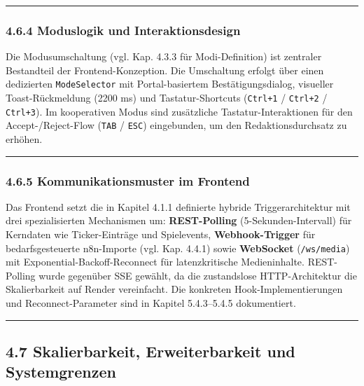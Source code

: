 \begin{center}\rule{0.5\linewidth}{0.5pt}\end{center}

\subsubsection{4.6.4 Moduslogik und
Interaktionsdesign}\label{moduslogik-und-interaktionsdesign}

Die Modusumschaltung (vgl. Kap. 4.3.3 für Modi-Definition) ist zentraler
Bestandteil der Frontend-Konzeption. Die Umschaltung erfolgt über einen
dedizierten \passthrough{\lstinline!ModeSelector!} mit Portal-basiertem
Bestätigungsdialog, visueller Toast-Rückmeldung (2200 ms) und
Tastatur-Shortcuts (\passthrough{\lstinline!Ctrl+1!} /
\passthrough{\lstinline!Ctrl+2!} / \passthrough{\lstinline!Ctrl+3!}). Im
kooperativen Modus sind zusätzliche Tastatur-Interaktionen für den
Accept-/Reject-Flow (\passthrough{\lstinline!TAB!} /
\passthrough{\lstinline!ESC!}) eingebunden, um den Redaktionsdurchsatz
zu erhöhen.

\begin{center}\rule{0.5\linewidth}{0.5pt}\end{center}

\subsubsection{4.6.5 Kommunikationsmuster im
Frontend}\label{kommunikationsmuster-im-frontend}

Das Frontend setzt die in Kapitel 4.1.1 definierte hybride
Triggerarchitektur mit drei spezialisierten Mechanismen um:
\textbf{REST-Polling} (5-Sekunden-Intervall) für Kerndaten wie
Ticker-Einträge und Spielevents, \textbf{Webhook-Trigger} für
bedarfsgesteuerte n8n-Importe (vgl. Kap. 4.4.1) sowie \textbf{WebSocket}
(\passthrough{\lstinline!/ws/media!}) mit Exponential-Backoff-Reconnect
für latenzkritische Medieninhalte. REST-Polling wurde gegenüber SSE
gewählt, da die zustandslose HTTP-Architektur die Skalierbarkeit auf
Render vereinfacht. Die konkreten Hook-Implementierungen und
Reconnect-Parameter sind in Kapitel 5.4.3--5.4.5 dokumentiert.

\begin{center}\rule{0.5\linewidth}{0.5pt}\end{center}

\subsection{4.7 Skalierbarkeit, Erweiterbarkeit und
Systemgrenzen}\label{skalierbarkeit-erweiterbarkeit-und-systemgrenzen}

